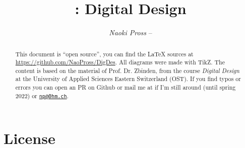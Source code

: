 \documentclass[margin=small]{tex/hsrzf}
\author{\textsl{Naoki Pross} -- \texttt{\theauthoremail}}
\title{\texttt{\themodule}: Digital Design}
\date{\thesemester}
\begin{document}
\maketitle

\begin{abstract}
  This document is ``open source'', you can find the \LaTeX{} sources at
  \url{https://github.com/NaoPross/DigDes}. All diagrams were made with TikZ.
  The content is based on the material of Prof. Dr. Zbinden, from the course
  \emph{Digital Design} at the University of Applied Sciences Eastern
  Switzerland (OST). If you find typos or errors you can open an PR on Github
  or mail me at \href{mailto:\theauthoremail}{\texttt{\theauthoremail}} if I'm still
  around (until spring 2022) or \href{mailto:np@0hm.ch}{\texttt{np@0hm.ch}}.
\end{abstract}

\tableofcontents

\section*{License}
\doclicenseThis{}

\twocolumn

\setcounter{page}{1}






\end{document}
